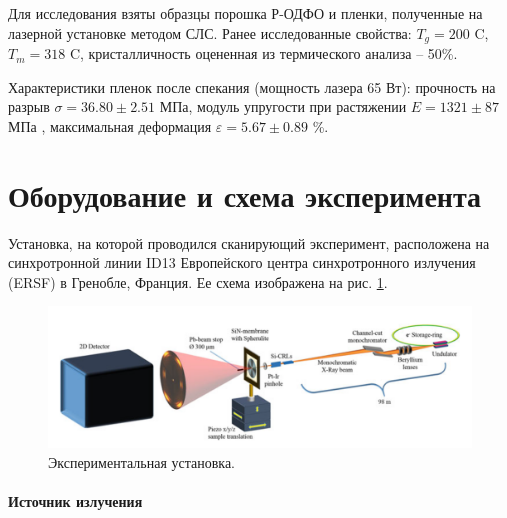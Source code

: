 Для исследования взяты образцы порошка Р-ОДФО и пленки, полученные на лазерной установке методом СЛС. Ранее исследованные свойства\cite{vaganov}:
 $T_g = 200$ \textdegree C, $T_m = 318$ \textdegree C, кристалличность оцененная из термического анализа -- 50\%.

Характеристики пленок после спекания (мощность лазера 65 Вт):
прочность на разрыв $ \sigma =36.80 \pm 2.51$ МПа, модуль упругости при растяжении   $ E = 1321 \pm 87$ МПа , максимальная деформация $ \varepsilon = 5.67  \pm 0.89$ \%. 


\section{Оборудование и схема эксперимента}
Установка, на которой проводился сканирующий эксперимент, расположена на синхротронной линии ID13 Европейского центра синхротронного излучения (ERSF) в Гренобле, Франция. Ее схема  изображена на рис. \ref{fig:experiment}. 

\begin{figure}[h]
    \centering
    \includegraphics[width=\linewidth]{fig/ust.PNG}
    \caption{Экспериментальная установка. \cite{experiment}}
    \label{fig:experiment}
\end{figure}

\paragraph{Источник излучения}

